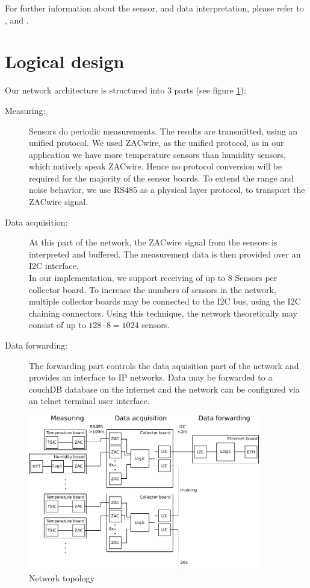 \documentclass[a4paper]{scrreprt}
\begin{document}
For further information about the sensor, and data interpretation, please refer to \cite{hyt}, \cite{hyt3} and \cite{hyt2}.
\section{Logical design}
Our network architecture is structured into 3 parts (see figure \ref{fig:topo}):
\begin{description}
  \item[Measuring:]
    Sensors do periodic measurements. The results are transmitted,
    using an unified protocol. We used ZACwire, as the unified
    protocol, as in our application we have more temperature sensors
    than humidity sensors, which natively speak ZACwire. Hence no
    protocol conversion will be required for the majority of the
    sensor boards. To extend the range and noise behavior, we use
    RS485 as a physical layer protocol, to transport the ZACwire
    signal.
  \item[Data acquisition:]
    At this part of the network, the ZACwire signal from the sensors
    is interpreted and buffered. The measurement data is then
    provided over an I2C interface.\\
    In our implementation, we support receiving of up to 8 Sensors
    per collector board. To increase the numbers of sensors in the
    network, multiple collector boards may be connected to the I2C
    bus, using the I2C chaining connectors. Using this technique,
    the network theoretically may consist of up to
    $128\cdot 8 = 1024$ sensors.
  \item[Data forwarding:]
    The forwarding part controls the data aquisition part of the
    network and provides an interface to IP networks. Data may be
    forwarded to a couchDB database on the internet and the network
    can be configured via an telnet terminal user interface.
\end{description}
\begin{figure}
	\centering
	\includegraphics[width=0.9\textwidth]{img/plan2.pdf}
	\caption{Network topology}
	\label{fig:topo}
\end{figure}
\end{document}
